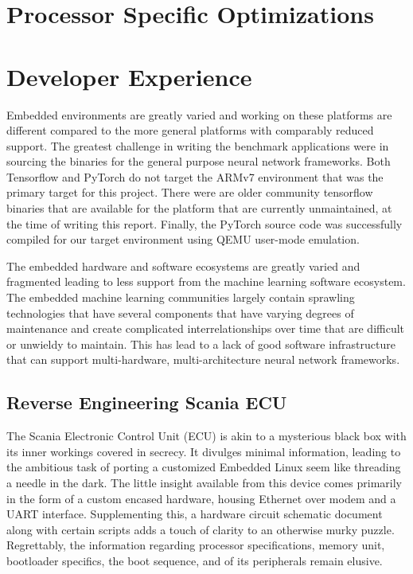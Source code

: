 
\section{Processor Specific Optimizations}

\section{Developer Experience}

Embedded environments are greatly varied and working on these platforms are different compared to the more general platforms with comparably reduced support. The greatest challenge in writing the benchmark applications were in sourcing the binaries for the general purpose neural network frameworks. Both Tensorflow and PyTorch do not target the ARMv7 environment that was the primary target for this project. There were are older community tensorflow binaries that are available for the platform that are currently unmaintained, at the time of writing this report. Finally, the PyTorch source code was successfully compiled for our target environment using QEMU user-mode emulation.

The embedded hardware and software ecosystems are greatly varied and fragmented leading to less support from the machine learning software ecosystem. The embedded machine learning communities largely contain sprawling technologies that have several components that have varying degrees of maintenance and create complicated interrelationships over time that are difficult or unwieldy to maintain. This has lead to a lack of good software infrastructure that can support multi-hardware, multi-architecture neural network frameworks.

\subsection{Reverse Engineering Scania ECU}

The Scania Electronic Control Unit (ECU) is akin to a mysterious black box with its inner workings covered in secrecy. It divulges minimal information, leading to the ambitious task of porting a customized Embedded Linux seem like threading a needle in the dark. The little insight available from this device comes primarily in the form of a custom encased hardware, housing Ethernet over modem and a UART interface. Supplementing this, a hardware circuit schematic document along with certain scripts adds a touch of clarity to an otherwise murky puzzle. Regrettably, the information regarding processor specifications, memory unit, bootloader specifics, the boot sequence, and of its peripherals remain elusive.

